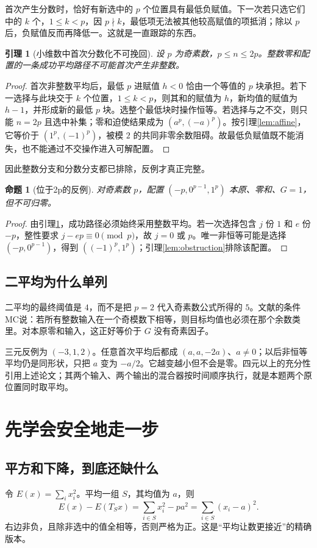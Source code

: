 \documentclass[11pt,a4paper,oneside,openany]{book}
\newtheorem{lemma}[theorem]{引理}
\newtheorem{proposition}[theorem]{命题}
\theoremstyle{definition}
\numberwithin{equation}{chapter}
\begin{document}
首次产生分数时，恰好有新选中的 $p$ 个位置具有最低负赋值。下一次若只选它们中的 $k$ 个，$1\le k<p$，因 $p\nmid k$，最低项无法被其他较高赋值的项抵消；除以 $p$ 后，负赋值反而再降低一。这就是一直跟踪的东西。
\begin{lemma}[小维数中首次分数化不可挽回]\label{lem:fraction}
设 $p$ 为奇素数，$p\le n\le2p$。整数零和配置的一条成功平均路径不可能首次产生非整数。
\end{lemma}
\begin{proof}
首次非整数平均后，最低 $p$ 进赋值 $h<0$ 恰由一个等值的 $p$ 块承担。若下一选择与此块交于 $k$ 个位置，$1\le k<p$，则其和的赋值为 $h$，新均值的赋值为 $h-1$，并形成新的最低 $p$ 块。选整个最低块时操作恒等。若选择与之不交，则只能 $n=2p$ 且选中补集；零和迫使结果成为 $(a^p,(-a)^p)$。按引理\ref{lem:affine}，它等价于 $(1^p,(-1)^p)$，被模 $2$ 的共同非零余数阻碍。故最低负赋值既不能消失，也不能通过不交操作进入可解配置。
\end{proof}
因此整数分支和分数分支都已排除，反例才真正完整。
\begin{proposition}[位于2p的反例]\label{prop:lower}
对奇素数 $p$，配置 $(-p,0^{p-1},1^p)$ 本原、零和、$G=1$，但不可归零。
\end{proposition}
\begin{proof}
由引理\ref{lem:fraction}，成功路径必须始终采用整数平均。若一次选择包含 $j$ 份 $1$ 和 $e$ 份 $-p$，整性要求 $j-ep\equiv0\pmod p$，故 $j=0$ 或 $p$。唯一非恒等可能是选择 $(-p,0^{p-1})$，得到 $((-1)^p,1^p)$；引理\ref{lem:obstruction}排除该配置。
\end{proof}

\section{二平均为什么单列}
二平均的最终阈值是 $4$，而不是把 $p=2$ 代入奇素数公式所得的 $5$。文献\cite{mixing}的条件MC说：若所有整数输入在一个奇模数下相等，则目标均值也必须在那个余数类里。对本原零和输入，这正好等价于 $G$ 没有奇素因子。

三元反例为 $(-3,1,2)$。任意首次平均后都成 $(a,a,-2a)$、$a\ne0$；以后非恒等平均仍是同形状，只把 $a$ 变为 $-a/2$。它越变越小但不会是零。四元以上的充分性引用上述论文；其两个输入、两个输出的混合器按时间顺序执行，就是本题两个原位置同时取平均。

\chapter{先学会安全地走一步}\label{sec:descent}
\section{平方和下降，到底还缺什么}
令 $E(x)=\sum_i x_i^2$。平均一组 $S$，其均值为 $a$，则
\[
E(x)-E(T_Sx)=\sum_{i\in S}x_i^2-pa^2
=\sum_{i\in S}(x_i-a)^2.
\]
右边非负，且除非选中的值全相等，否则严格为正。这是“平均让数更接近”的精确版本。
\end{document}
